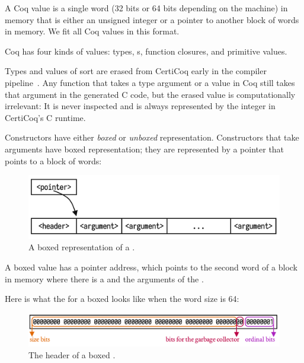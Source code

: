 A Coq value is a single word (32 bits or 64 bits depending on the machine) in memory that is either an unsigned integer or a pointer to another block of words in memory. We fit all Coq values in this format.

Coq has four kinds of values: types, \constructor{}s, function \gls{closure}s, and \gls{primitive} values.

Types and values of sort  are erased from CertiCoq early in the compiler pipeline~\cite{certicoq, belanger2019verified, paraskevopoulou2020verified}. Any function that takes a type argument or a  value in Coq still takes that argument in the generated C code, but the erased value is computationally irrelevant: It is never inspected and is always represented by the integer  in CertiCoq's C runtime.

Constructors have either \emph{\gls{boxed}} or \emph{\gls{unboxed}} representation.
Constructors that take arguments have \gls{boxed} representation; they are represented by a pointer that points to a block of words:

\begin{figure}[H]
\includegraphics[scale=.59]{figures/boxed-value.pdf}
\centering
\caption{A \gls{boxed} representation of a \constructor{}.}
\end{figure}

\newpage
A \gls{boxed} value has a pointer address, which points to the second word of a block in memory where there is a \header{} and the arguments of the \constructor. 

Here is what the \header{} for a \gls{boxed} \constructor{} looks like when the word size is 64:

\begin{figure}[H]
\includegraphics[scale=.59]{figures/boxed-header.pdf}
\centering
\caption{The header of a \gls{boxed} \constructor{}.}
\end{figure}

